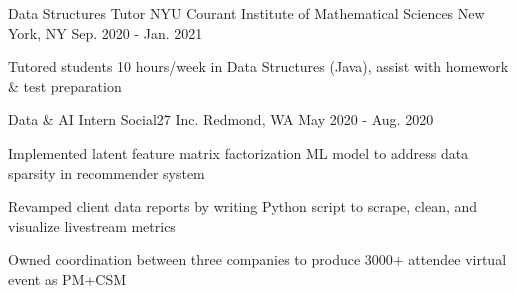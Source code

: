 \begin{cventries}
    \cventry
    {Data Structures Tutor} %
    {NYU Courant Institute of Mathematical Sciences} %
    {New York, NY} %
    {Sep. 2020 - Jan. 2021} %
    {
      \begin{cvitems} %
        \item {Tutored students 10 hours/week in Data Structures (Java), assist with homework \& test preparation}
      \end{cvitems}
    }

  \cventry
    {Data \& AI Intern} %
    {Social27 Inc.} %
    {Redmond, WA} %
    {May 2020 - Aug. 2020} %
    {
      \begin{cvitems} %
        \item {Implemented latent feature matrix factorization ML model to address data sparsity in recommender system}
        \item {Revamped client data reports by writing Python script to scrape, clean, and visualize livestream metrics}
        \item {Owned coordination between three companies to produce 3000+ attendee virtual event as PM+CSM}
      \end{cvitems}
    }


\end{cventries}